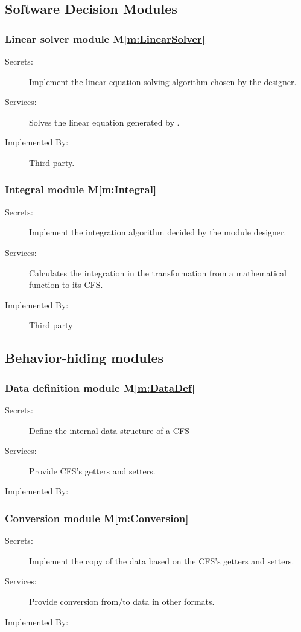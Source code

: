\documentclass[12pt, titlepage]{article}
\newcommand{\mref}[1]{M\ref{m:#1}}
\begin{document}
\subsection{Software Decision Modules}
\subsubsection{Linear solver module \mref{LinearSolver}}

\begin{description}
\item[Secrets:]Implement the linear equation solving algorithm chosen by the designer.
\item[Services:]Solves the linear equation generated by \progname.
\item[Implemented By:] Third party.
\end{description}
\subsubsection{Integral module \mref{Integral}}

\begin{description}
	\item[Secrets:]Implement the integration algorithm decided by the module designer.
	\item[Services:]Calculates the integration in the transformation from a mathematical function to its CFS.
	\item[Implemented By:] Third party
\end{description}

\subsection{Behavior-hiding modules}
\subsubsection{Data definition module \mref{DataDef}}
\begin{description}
\item[Secrets:] Define the internal data structure of a CFS 
\item[Services:] Provide CFS's getters and setters.
\item[Implemented By:] \progname
\end{description}
\subsubsection{Conversion module \mref{Conversion}}
\begin{description}
	\item[Secrets:] Implement the copy of the data based on the CFS's getters and setters.
	\item[Services:] Provide conversion from/to data in other formats. 
	\item[Implemented By:] \progname
\end{description}
\end{document}
